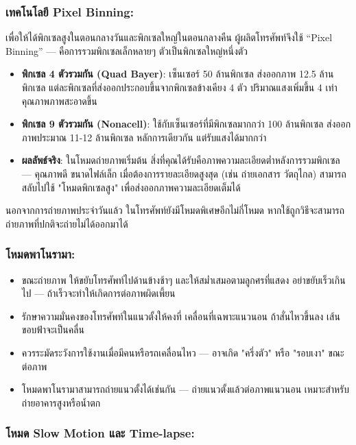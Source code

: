 \subsubsection*{เทคโนโลยี Pixel Binning:}

เพื่อให้ได้พิกเซลสูงในตอนกลางวันและพิกเซลใหญ่ในตอนกลางคืน ผู้ผลิตโทรศัพท์จึงใช้ “Pixel Binning” — คือการรวมพิกเซลเล็กหลายๆ ตัวเป็นพิกเซลใหญ่หนึ่งตัว

\begin{itemize}
  \item \textbf{พิกเซล 4 ตัวรวมกัน (Quad Bayer)}: เซ็นเซอร์ 50 ล้านพิกเซล ส่งออกภาพ 12.5 ล้านพิกเซล แต่ละพิกเซลที่ส่งออกประกอบขึ้นจากพิกเซลข้างเคียง 4 ตัว ปริมาณแสงเพิ่มขึ้น 4 เท่า คุณภาพภาพสะอาดขึ้น
  \item \textbf{พิกเซล 9 ตัวรวมกัน (Nonacell)}: ใช้กับเซ็นเซอร์ที่มีพิกเซลมากกว่า 100 ล้านพิกเซล ส่งออกภาพประมาณ 11-12 ล้านพิกเซล หลักการเดียวกัน แต่รับแสงได้มากกว่า
  \item \textbf{ผลลัพธ์จริง}: ในโหมดถ่ายภาพเริ่มต้น สิ่งที่คุณได้รับคือภาพความละเอียดต่ำหลังการรวมพิกเซล — คุณภาพดี ขนาดไฟล์เล็ก เมื่อต้องการรายละเอียดสูงสุด (เช่น ถ่ายเอกสาร วัตถุไกล) สามารถสลับไปใช้ "โหมดพิกเซลสูง" เพื่อส่งออกภาพความละเอียดเต็มได้
\end{itemize}


นอกจากการถ่ายภาพประจำวันแล้ว ในโทรศัพท์ยังมีโหมดพิเศษอีกไม่กี่โหมด หากใช้ถูกวิธีจะสามารถถ่ายภาพที่ปกติจะถ่ายไม่ได้ออกมาได้

\subsubsection*{โหมดพาโนรามา:}

\begin{itemize}
  \item ขณะถ่ายภาพ ให้ขยับโทรศัพท์ไปด้านข้างช้าๆ และให้สม่ำเสมอตามลูกศรที่แสดง อย่าขยับเร็วเกินไป — ถ้าเร็วจะทำให้เกิดการต่อภาพผิดเพี้ยน
  \item รักษาความมั่นคงของโทรศัพท์ในแนวตั้งให้คงที่ เคลื่อนที่เฉพาะแนวนอน ถ้าสั่นไหวขึ้นลง เส้นขอบฟ้าจะเป็นคลื่น
  \item ควรระมัดระวังการใช้งานเมื่อมีคนหรือรถเคลื่อนไหว — อาจเกิด "ครึ่งตัว" หรือ "รอบเงา" ขณะต่อภาพ
  \item โหมดพาโนรามาสามารถถ่ายแนวตั้งได้เช่นกัน — ถ่ายแนวตั้งแล้วต่อภาพแนวนอน เหมาะสำหรับถ่ายอาคารสูงหรือน้ำตก
\end{itemize}

\subsubsection*{โหมด Slow Motion และ Time-lapse:}

